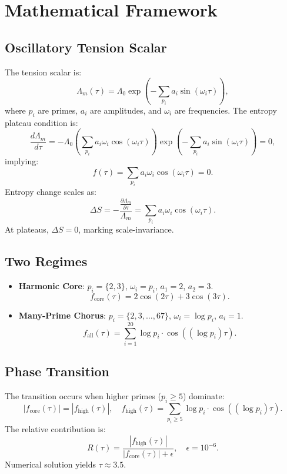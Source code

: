\documentclass[11pt]{article}
\theoremstyle{definition}
\begin{document}
\section{Mathematical Framework}
\subsection{Oscillatory Tension Scalar}
The tension scalar is:
\begin{equation}
\Lambda_m(\tau) = \Lambda_0 \exp\left(-\sum_{p_i} a_i \sin(\omega_i \tau)\right),
\end{equation}
where \( p_i \) are primes, \( a_i \) are amplitudes, and \( \omega_i \) are frequencies. The entropy plateau condition is:
\begin{equation}
\frac{d \Lambda_m}{d \tau} = -\Lambda_0 \left( \sum_{p_i} a_i \omega_i \cos(\omega_i \tau) \right) \exp\left(-\sum_{p_i} a_i \sin(\omega_i \tau)\right) = 0,
\end{equation}
implying:
\begin{equation}
f(\tau) = \sum_{p_i} a_i \omega_i \cos(\omega_i \tau) = 0.
\end{equation}
Entropy change scales as:
\begin{equation}
\Delta S = -\frac{\frac{\partial \Lambda_m}{\partial \tau}}{\Lambda_m} = \sum_{p_i} a_i \omega_i \cos(\omega_i \tau).
\end{equation}
At plateaus, \( \Delta S = 0 \), marking scale-invariance.

\subsection{Two Regimes}
\begin{itemize}
    \item \textbf{Harmonic Core}: \( p_i = \{2, 3\} \), \( \omega_i = p_i \), \( a_1 = 2 \), \( a_2 = 3 \).
        \[
        f_{\text{core}}(\tau) = 2 \cos(2\tau) + 3 \cos(3\tau).
        \]
    \item \textbf{Many-Prime Chorus}: \( p_i = \{2, 3, \ldots, 67\} \), \( \omega_i = \log p_i \), \( a_i = 1 \).
        \[
        f_{\text{all}}(\tau) = \sum_{i=1}^{20} \log p_i \cdot \cos((\log p_i) \tau).
        \]
\end{itemize}

\subsection{Phase Transition}
The transition occurs when higher primes (\( p_i \geq 5 \)) dominate:
\begin{equation}
|f_{\text{core}}(\tau)| = |f_{\text{high}}(\tau)|, \quad f_{\text{high}}(\tau) = \sum_{p_i \geq 5} \log p_i \cdot \cos((\log p_i) \tau).
\end{equation}
The relative contribution is:
\begin{equation}
R(\tau) = \frac{|f_{\text{high}}(\tau)|}{|f_{\text{core}}(\tau)| + \epsilon}, \quad \epsilon = 10^{-6}.
\end{equation}
Numerical solution yields \( \tau \approx 3.5 \).
\end{document}
